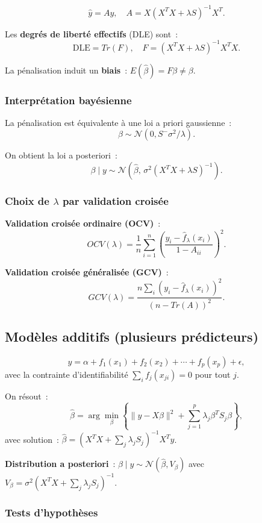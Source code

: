 \documentclass[11pt,letterpaper]{article}
\begin{document}
$$\hat{y} = Ay, \quad A = X(X^TX + \lambda S)^{-1}X^T.$$

Les \textbf{degrés de liberté effectifs} (DLE) sont~:
$$\text{DLE} = Tr(F), \quad F = (X^TX + \lambda S)^{-1}X^TX.$$

La pénalisation induit un \textbf{biais}~: $E(\hat{\beta}) = F\beta \neq \beta$.

\subsubsection{Interprétation bayésienne}

La pénalisation est équivalente à une loi a priori gaussienne~:
$$\beta \sim \mathcal{N}(0, S^{-}\sigma^2/\lambda).$$

On obtient la loi a posteriori~:
$$\beta \mid y \sim \mathcal{N}(\hat{\beta},\, \sigma^2(X^TX + \lambda S)^{-1}).$$

\subsubsection{Choix de $\lambda$ par validation croisée}

\textbf{Validation croisée ordinaire (OCV)}~:
$$OCV(\lambda) = \frac{1}{n}\sum_{i=1}^n\left(\frac{y_i - \hat{f}_\lambda(x_i)}{1-A_{ii}}\right)^2.$$

\textbf{Validation croisée généralisée (GCV)}~:
$$GCV(\lambda) = \frac{n\sum_i(y_i - \hat{f}_\lambda(x_i))^2}{(n - Tr(A))^2}.$$

\subsection{Modèles additifs (plusieurs prédicteurs)}

$$y = \alpha + f_1(x_1) + f_2(x_2) + \cdots + f_p(x_p) + \epsilon,$$
avec la contrainte d'identifiabilité $\sum_i f_j(x_{ji}) = 0$ pour tout $j$.

On résout~:
$$\hat{\beta} = \arg\min_\beta\left\{\|y - X\beta\|^2 + \sum_{j=1}^p \lambda_j\beta^TS_j\beta\right\},$$
avec solution~: $\hat{\beta} = (X^TX + \sum_j \lambda_j S_j)^{-1}X^Ty$.

\textbf{Distribution a posteriori}~: $\beta \mid y \sim \mathcal{N}(\hat{\beta}, V_\beta)$ avec $V_\beta = \sigma^2(X^TX + \sum_j \lambda_j S_j)^{-1}$.

\subsubsection{Tests d'hypothèses}
\end{document}
